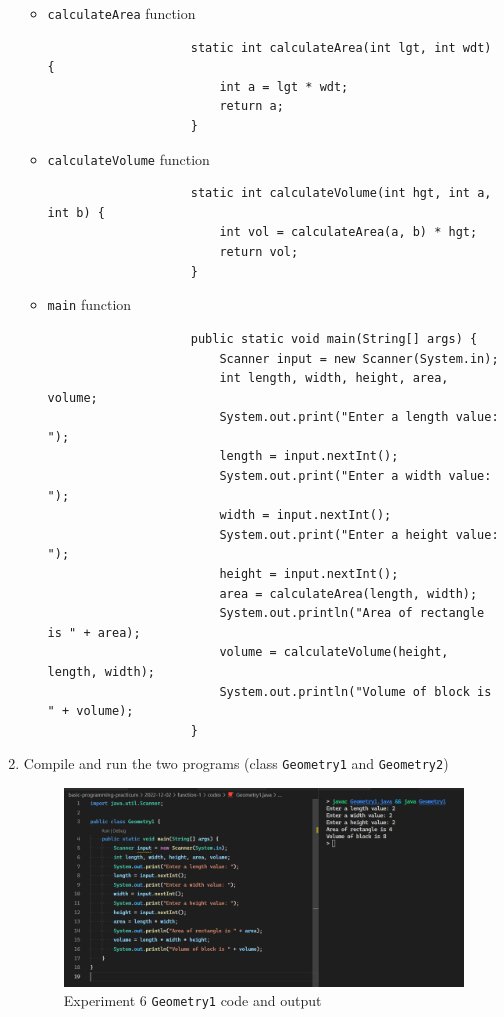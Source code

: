 \documentclass[12pt,titlepage]{article}
\begin{document}
\begin{enumerate}
{        \begin{itemize}
            \item {
                \texttt{calculateArea} function
                \begin{verbatim}
                    static int calculateArea(int lgt, int wdt) {
                        int a = lgt * wdt;
                        return a;
                    }
                \end{verbatim}
            }
            \item {
                \texttt{calculateVolume} function
                \begin{verbatim}
                    static int calculateVolume(int hgt, int a, int b) {
                        int vol = calculateArea(a, b) * hgt;
                        return vol;
                    }
                \end{verbatim}
            }
            \item {
                \texttt{main} function
                \begin{verbatim}
                    public static void main(String[] args) {
                        Scanner input = new Scanner(System.in);
                        int length, width, height, area, volume;
                        System.out.print("Enter a length value: ");
                        length = input.nextInt();
                        System.out.print("Enter a width value: ");
                        width = input.nextInt();
                        System.out.print("Enter a height value: ");
                        height = input.nextInt();
                        area = calculateArea(length, width);
                        System.out.println("Area of rectangle is " + area);
                        volume = calculateVolume(height, length, width);
                        System.out.println("Volume of block is " + volume);
                    }
                \end{verbatim}
            }
        \end{itemize}
    }
    \item {
        Compile and run the two programs (class \texttt{Geometry1} and \texttt{Geometry2})

        \begin{figure}[h]
            \centering
            \includegraphics[width=.7\textwidth]{./images/geometry-one.png}
            \caption{Experiment 6 \texttt{Geometry1} code and output}
        \end{figure}

}
\end{enumerate}
\end{document}
